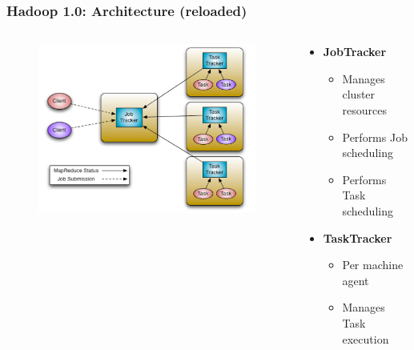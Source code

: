 \begin{frame}
\frametitle{Hadoop 1.0: Architecture (reloaded)}
\begin{columns}[onlytextwidth]
  \begin{column}{0.3\textwidth}
    \begin{figure}[h]
    \centering
    \includegraphics[scale=0.35]{./figures/yarn_hadoop1_arch}
    \label{fig:yarn_h1_arch}
    \end{figure}
  \end{column}

  \begin{column}{0.5\textwidth}
    \begin{itemize}
      \item {\bf JobTracker}
      \begin{itemize}
        \item Manages cluster resources
        \item Performs Job scheduling
        \item Performs Task scheduling
      \end{itemize}

\vspace{20pt}

      \item {\bf TaskTracker}
      \begin{itemize}
        \item Per machine agent
        \item Manages Task execution
      \end{itemize}
    \end{itemize}
  \end{column}
\end{columns}
\end{frame}


